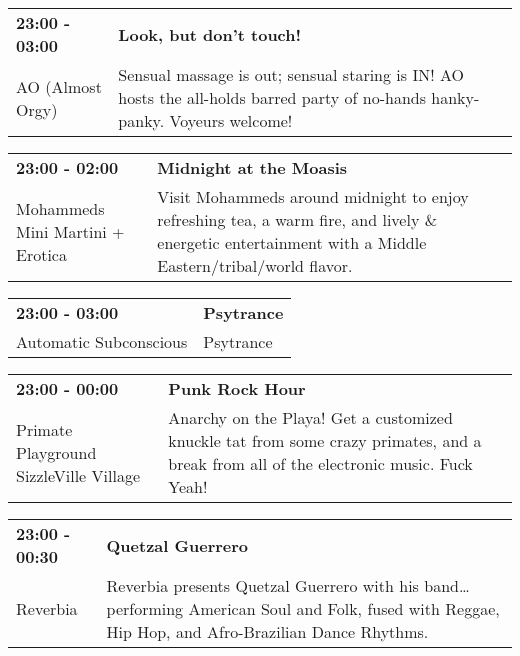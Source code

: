 \begin{tabular}{ p{1in} p{2.2in} }
    \textbf{23:00 - 03:00} & \textbf{Look, but don't touch!} \\
    AO (Almost Orgy) \newline  & Sensual massage is out; sensual staring is IN! AO hosts the all-holds barred party of no-hands hanky-panky. Voyeurs welcome! \\
    \hline 
\end{tabular}
    
\begin{tabular}{ p{1in} p{2.2in} }
    \textbf{23:00 - 02:00} & \textbf{Midnight at the Moasis} \\
    Mohammeds Mini Martini + Erotica \newline  & Visit Mohammeds around midnight to enjoy refreshing tea, a warm fire, and lively \& energetic entertainment with a Middle Eastern/tribal/world flavor. \\
    \hline 
\end{tabular}
    
\begin{tabular}{ p{1in} p{2.2in} }
    \textbf{23:00 - 03:00} & \textbf{Psytrance} \\
    Automatic Subconscious \newline  & Psytrance \\
    \hline 
\end{tabular}
    
\begin{tabular}{ p{1in} p{2.2in} }
    \textbf{23:00 - 00:00} & \textbf{Punk Rock Hour} \\
    Primate Playground \newline SizzleVille Village & Anarchy on the Playa! Get a customized knuckle tat from some crazy primates, and a break from all of the electronic music. Fuck Yeah! \\
    \hline 
\end{tabular}
    
\begin{tabular}{ p{1in} p{2.2in} }
    \textbf{23:00 - 00:30} & \textbf{Quetzal Guerrero} \\
    Reverbia \newline  & Reverbia presents Quetzal Guerrero with his band\ldots performing American Soul and Folk, fused with Reggae, Hip Hop, and Afro-Brazilian Dance Rhythms. \\
    \hline 
\end{tabular}
    
